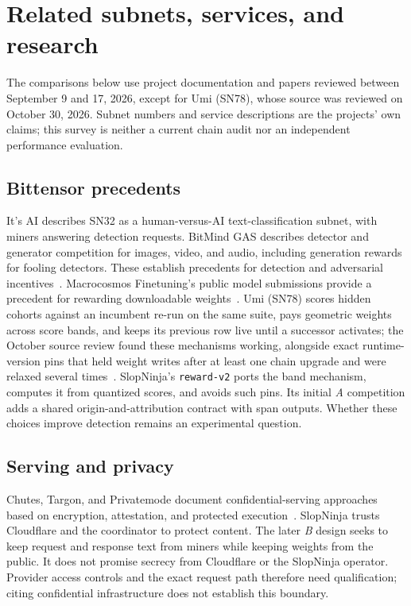 \section{Related subnets, services, and research}\label{related-work}

The comparisons below use project documentation and papers reviewed between
September 9 and 17, 2026, except for Umi (SN78), whose source was reviewed on
October 30, 2026. Subnet numbers and service descriptions are the
projects' own claims; this survey is neither a current chain audit nor an
independent performance evaluation.

\subsection{Bittensor precedents}\label{related-subnets}

It's AI describes SN32 as a human-versus-AI text-classification subnet, with
miners answering detection requests. BitMind GAS describes detector and
generator competition for images, video, and audio, including generation
rewards for fooling detectors. These establish precedents for detection and
adversarial incentives~\cite{itsai,itsaifaq,bitmindgas,gasgeneration}.
Macrocosmos Finetuning's public model submissions provide a precedent for
rewarding downloadable weights~\cite{finetuning}. Umi (SN78) scores hidden
cohorts against an incumbent re-run on the same suite, pays geometric weights
across score bands, and keeps its previous row live until a successor activates;
the October source review found these mechanisms working, alongside
exact runtime-version pins that held weight writes after at least one chain
upgrade and were relaxed several times~\cite{umisn78}. SlopNinja's \texttt{reward-v2} ports the band mechanism,
computes it from quantized scores, and avoids such pins. Its initial \textit{A} competition adds a shared
origin-and-attribution contract with span outputs. Whether these choices
improve detection remains an experimental question.

\subsection{Serving and privacy}\label{related-confidential-inference}

Chutes, Targon, and Privatemode document confidential-serving approaches based
on encryption, attestation, and protected execution~\cite{chutes,chutesprivacy,
targon,targonconfidential,privateattestation,privatecache}. SlopNinja trusts
Cloudflare and the coordinator to protect content.
The later \textit{B} design seeks to keep request and response text from miners
while keeping weights from the public. It does not promise secrecy from
Cloudflare or the SlopNinja operator. Provider access controls and the exact
request path therefore need qualification; citing confidential infrastructure
does not establish this boundary.

